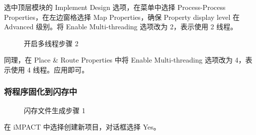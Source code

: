 \documentclass[hyperref,UTF8,12pt,a4paper]{ctexart}
\begin{document}
选中顶层模块的 Implement Design 选项，在菜单中选择 Process-Process
Properties，在左边窗格选择 Map Properties，确保 Property display level
在 Advanced 级别。将 Enable Multi-threading 选项改为 2，表示使用 2
线程。

\begin{figure}[H]
\centering
{}
\caption{开启多线程步骤 2}
\end{figure}

同理，在 Place \& Route Properties 中将 Enable Multi-threading 选项改为
4，表示使用 4 线程。应用即可。

\hypertarget{ux5c06ux7a0bux5e8fux56faux5316ux5230ux95eaux5b58ux4e2d}{%
\subsubsection{将程序固化到闪存中}\label{ux5c06ux7a0bux5e8fux56faux5316ux5230ux95eaux5b58ux4e2d}}

\begin{figure}[H]
\centering
{}
\caption{闪存文件生成步骤 1}
\end{figure}

在 iMPACT 中选择创建新项目，对话框选择 Yes。
\end{document}
